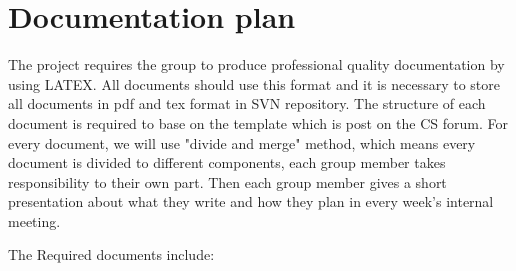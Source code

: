 \documentclass[11pt, a4paper]{report}
\begin{document}
\section{Documentation plan}
The project requires the group to produce professional quality documentation by using LATEX. All documents should use this format and it is necessary to store all documents in pdf and tex format in SVN repository. The structure of each document is required to base on the template which is post on the CS forum. For every document, we will use "divide and merge" method, which means every document is divided to different components, each group member takes responsibility to their own part. Then each group member gives a short presentation about what they write and how they plan in every week's internal meeting.

The Required documents include:
\end{document}
